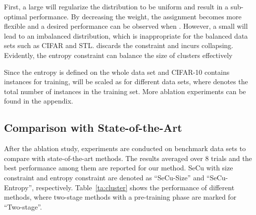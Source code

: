 \documentclass[10pt,twocolumn,letterpaper]{article}
\begin{document}
First, a large  will regularize the distribution to be uniform and result in a sub-optimal performance. By decreasing the weight, the assignment becomes more flexible and a desired performance can be observed when . However, a small  will lead to an imbalanced distribution, which is inappropriate for the balanced data sets such as CIFAR and STL.  discards the constraint and incurs collapsing. Evidently, the entropy constraint can balance the size of clusters effectively

Since the entropy is defined on the whole data set and CIFAR-10 contains  instances for training,  will be scaled as  for different data sets, where  denotes the total number of instances in the training set. More ablation experiments can be found in the appendix.


\subsection{Comparison with State-of-the-Art}
After the ablation study, experiments are conducted on benchmark data sets to compare with state-of-the-art methods. The results averaged over 8 trials and the best performance among them are reported for our method. SeCu with size constraint and entropy constraint are denoted as ``SeCu-Size'' and ``SeCu-Entropy'', respectively. Table~\ref{ta:cluster} shows the performance of different methods, where two-stage methods with a pre-training phase are marked for ``Two-stage''.
\end{document}
